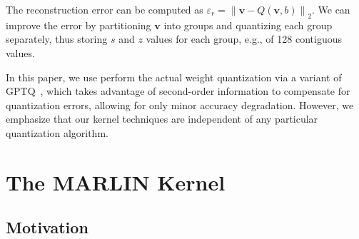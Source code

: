 \documentclass{article}
\theoremstyle{plain}
\theoremstyle{definition}
\theoremstyle{remark}
\newcommand{\myvec}[1]{\pmb{#1}}
\newcommand{\zeros}{z}
\newcommand{\scale}{s}
\begin{document}
The reconstruction error can be computed as $\varepsilon_r = \left\| \myvec{v} - Q \left( \myvec{v}, b \right) \right\|_2$. 
We can improve the error by partitioning $\myvec{v}$ into groups and quantizing each group separately, thus storing $\scale$ and $\zeros$ values for each group, e.g., of 128 contiguous values.  

In this paper, we use perform the actual weight quantization via a variant of GPTQ~\cite{frantar2022gptq}, which takes advantage of second-order information to compensate for quantization errors, allowing for only minor accuracy degradation. However, we emphasize that our kernel techniques are independent of any particular quantization algorithm.
















\section{The MARLIN Kernel} 
\label{sec:marlin-kernel}

\subsection{Motivation}
\end{document}
